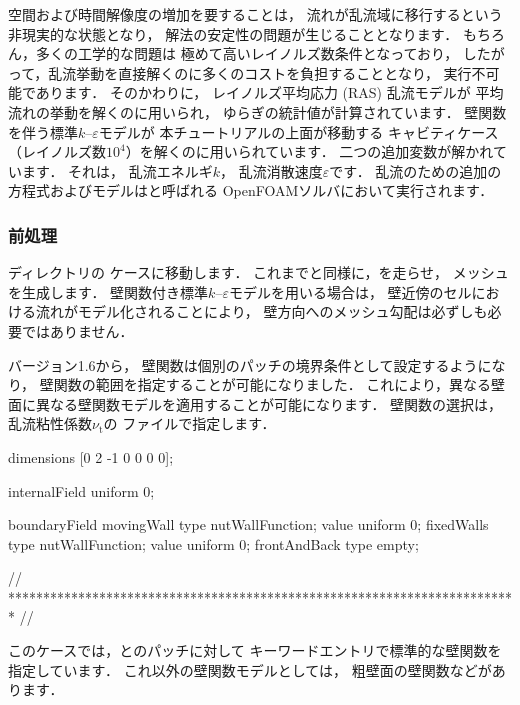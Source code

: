 空間および時間解像度の増加を要することは，
流れが乱流域に移行するという非現実的な状態となり，
解法の安定性の問題が生じることとなります．
もちろん，多くの工学的な問題は
極めて高いレイノルズ数条件となっており，
したがって，乱流挙動を直接解くのに多くのコストを負担することとなり，
実行不可能であります．
そのかわりに，
%
レイノルズ平均応力 (RAS) 乱流モデルが
平均流れの挙動を解くのに用いられ，
ゆらぎの統計値が計算されています．
壁関数を伴う標準$k$--$\varepsilon$モデルが
本チュートリアルの上面が移動する
キャビティケース（レイノルズ数$10^{4}$）を解くのに用いられています．
二つの追加変数が解かれています．
それは，
%
乱流エネルギ$k$，
%
乱流消散速度$\varepsilon$です．
乱流のための追加の方程式およびモデルはと呼ばれる
OpenFOAMソルバにおいて実行されます．

\subsubsection{前処理}
\label{sssec:2.1.8.1}
ディレクトリの
ケースに移動します．
これまでと同様に，を走らせ，
メッシュを生成します．
壁関数付き標準$k$--$\varepsilon$モデルを用いる場合は，
壁近傍のセルにおける流れがモデル化されることにより，
壁方向へのメッシュ勾配は必ずしも必要ではありません．

バージョン1.6から，
壁関数は個別のパッチの境界条件として設定するようになり，
壁関数の範囲を指定することが可能になりました．
これにより，異なる壁面に異なる壁関数モデルを適用することが可能になります．
壁関数の選択は，乱流粘性係数$\nu_{\mathrm{t}}$の
ファイルで指定します．
\begin{OFverbatim}[file, linenum=17]

dimensions      [0 2 -1 0 0 0 0];

internalField   uniform 0;

boundaryField
{
    movingWall
    {
        type            nutWallFunction;
        value           uniform 0;
    }
    fixedWalls
    {
        type            nutWallFunction;
        value           uniform 0;
    }
    frontAndBack
    {
        type            empty;
    }
}


// ************************************************************************* //
\end{OFverbatim}
このケースでは，とのパッチに対して
キーワードエントリで標準的な壁関数を指定しています．
これ以外の壁関数モデルとしては，
粗壁面の壁関数などがあります．

